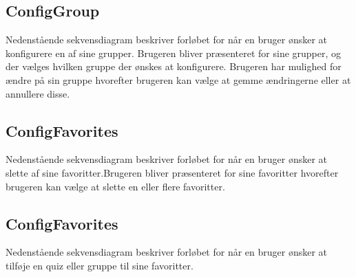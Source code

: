 
\subsection*{ConfigGroup}
Nedenstående sekvensdiagram beskriver forløbet for når en bruger ønsker at konfigurere en af sine grupper. Brugeren bliver præsenteret for sine grupper, og der vælges hvilken gruppe der ønskes at konfigurere. Brugeren har mulighed for ændre på sin gruppe hvorefter brugeren kan vælge at gemme ændringerne eller at annullere disse.


\subsection*{ConfigFavorites}
Nedenstående sekvensdiagram beskriver forløbet for når en bruger ønsker at slette af sine favoritter.Brugeren bliver præsenteret for sine favoritter hvorefter brugeren kan vælge at slette en eller flere favoritter.


\subsection*{ConfigFavorites}
Nedenstående sekvensdiagram beskriver forløbet for når en bruger ønsker at tilføje en quiz eller gruppe til sine favoritter.

